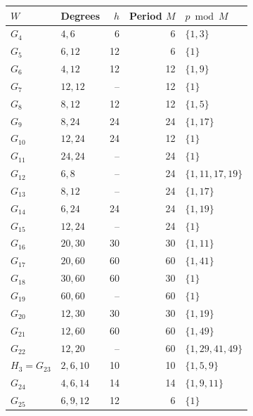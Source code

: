 \documentclass[11pt]{amsart}
\theoremstyle{definition}
\begin{document}
\begin{table}[htbp]
\centering\small
\setlength{\tabcolsep}{4pt}
\begin{tabular}{@{}lL{.31\textwidth}rrL{.25\textwidth}@{}}
\toprule $W$ & Degrees & $h$ & Period $M$ & $p\bmod M$\\\midrule
$G_{4}$ & $4,\allowbreak 6$ & 6 & 6 & $\{1,\allowbreak 3\}$ \\
$G_{5}$ & $6,\allowbreak 12$ & 12 & 6 & $\{1\}$ \\
$G_{6}$ & $4,\allowbreak 12$ & 12 & 12 & $\{1,\allowbreak 9\}$ \\
$G_{7}$ & $12,\allowbreak 12$ & -- & 12 & $\{1\}$ \\
$G_{8}$ & $8,\allowbreak 12$ & 12 & 12 & $\{1,\allowbreak 5\}$ \\
$G_{9}$ & $8,\allowbreak 24$ & 24 & 24 & $\{1,\allowbreak 17\}$ \\
$G_{10}$ & $12,\allowbreak 24$ & 24 & 12 & $\{1\}$ \\
$G_{11}$ & $24,\allowbreak 24$ & -- & 24 & $\{1\}$ \\
$G_{12}$ & $6,\allowbreak 8$ & -- & 24 & $\{1,\allowbreak 11,\allowbreak 17,\allowbreak 19\}$ \\
$G_{13}$ & $8,\allowbreak 12$ & -- & 24 & $\{1,\allowbreak 17\}$ \\
$G_{14}$ & $6,\allowbreak 24$ & 24 & 24 & $\{1,\allowbreak 19\}$ \\
$G_{15}$ & $12,\allowbreak 24$ & -- & 24 & $\{1\}$ \\
$G_{16}$ & $20,\allowbreak 30$ & 30 & 30 & $\{1,\allowbreak 11\}$ \\
$G_{17}$ & $20,\allowbreak 60$ & 60 & 60 & $\{1,\allowbreak 41\}$ \\
$G_{18}$ & $30,\allowbreak 60$ & 60 & 30 & $\{1\}$ \\
$G_{19}$ & $60,\allowbreak 60$ & -- & 60 & $\{1\}$ \\
$G_{20}$ & $12,\allowbreak 30$ & 30 & 30 & $\{1,\allowbreak 19\}$ \\
$G_{21}$ & $12,\allowbreak 60$ & 60 & 60 & $\{1,\allowbreak 49\}$ \\
$G_{22}$ & $12,\allowbreak 20$ & -- & 60 & $\{1,\allowbreak 29,\allowbreak 41,\allowbreak 49\}$ \\
$H_3=G_{23}$ & $2,\allowbreak 6,\allowbreak 10$ & 10 & 10 & $\{1,\allowbreak 5,\allowbreak 9\}$ \\
$G_{24}$ & $4,\allowbreak 6,\allowbreak 14$ & 14 & 14 & $\{1,\allowbreak 9,\allowbreak 11\}$ \\
$G_{25}$ & $6,\allowbreak 9,\allowbreak 12$ & 12 & 6 & $\{1\}$ \\

\end{tabular}
\end{table}
\end{document}
